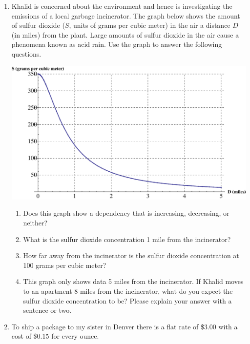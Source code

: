 \documentclass[12pt]{article}
\begin{document}
\hrulefill


\newpage

\begin{enumerate}
\item Khalid is concerned about the environment and hence is investigating the emissions of a local garbage incinerator.  The graph below shows the amount of sulfur dioxide ($S$, units of grams per cubic meter) in the air a distance $D$ (in miles) from the plant. Large amounts of sulfur dioxide in the air cause a phenomena known as acid rain. Use the graph to answer the following questions.

\begin{center}
 {\includegraphics [width = 8in] {garbageEmissions_B}}
\end{center}



\begin{enumerate}
\item Does this graph show a dependency that is increasing, decreasing, or neither?
\vfill
\item What is the sulfur dioxide concentration 1 mile from the incinerator?
\vfill
\item How far away from the incinerator is the sulfur dioxide concentration at 100 grams per cubic meter?
\vfill
\item This graph only shows data 5 miles from the incinerator.  If Khalid moves to an apartment 8 miles from the incinerator, what do you expect the sulfur dioxide concentration to be?  Please explain your answer with a sentence or two.
\vfill
\end{enumerate}
\newpage

\item  To ship a package to my sister in Denver there is a flat rate of \$3.00 with a cost of \$0.15 for every ounce.  


\end{enumerate}
\end{document}

